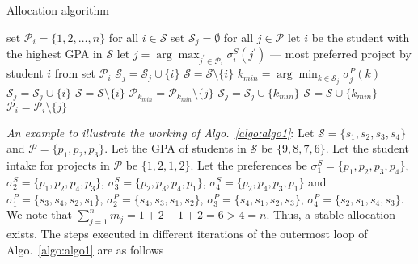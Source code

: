 \documentclass{article}
\begin{document}
\begin{algorithm}[ht]
\caption{Allocation algorithm \label{algo:algo1}}
\begin{algorithmic}[1]
\STATE set $\mathcal{P}_i = \{1,2,\ldots, n\}$ for all $i \in \mathcal{S}$
\STATE set $\mathcal{S}_j = \emptyset$ for all $j \in \mathcal{P}$
\STATE let $i$ be the student with the highest GPA in $\mathcal{S}$
\STATE let $j = \arg \max_{j^{'} \in \mathcal{P}_i } \sigma^S_i(j^{'})$ --- most preferred project by student $i$ from set $\mathcal{P}_i$
\STATE $\mathcal{S}_j = \mathcal{S}_j \cup \{i\}$
\STATE $\mathcal{S} = \mathcal{S} \setminus \{i\}$
\ELSE
\STATE $k_{min} = \arg \min_{k \in \mathcal{S}_j} \sigma^P_j(k)$ 
\STATE $\mathcal{S}_j = \mathcal{S}_j \cup \{ i\}$
\STATE $\mathcal{S} = \mathcal{S} \setminus \{i\}$
\STATE $\mathcal{P}_{k_{min}} = \mathcal{P}_{k_{min}} \setminus \{j\}$ 
\STATE $\mathcal{S}_j = \mathcal{S}_j \cup \{ k_{min}\}$
\STATE $\mathcal{S} = \mathcal{S} \cup \{k_{min}\}$
\ELSE
\STATE $\mathcal{P}_{i} = \mathcal{P}_{i} \setminus \{j\}$ 
\ENDIF
\ENDIF
\ENDWHILE
\end{algorithmic}
\end{algorithm}


\medskip
\noindent
\textit{An example to illustrate the working of Algo.~\ref{algo:algo1}}: Let $\mathcal{S} = \{s_1, s_2, s_3, s_4\}$ and $\mathcal{P} = \{p_1, p_2, p_3\}$. Let the GPA of students in $\mathcal{S}$ be $\{9,8,7,6\}$. Let the student intake for projects in $\mathcal{P}$ be $\{1,2,1,2\}$. Let the preferences be $\sigma^S_1 = \{p_1, p_2, p_3, p_4\}$, $\sigma^S_2 = \{p_1, p_2, p_4, p_3\}$, $\sigma^S_3 = \{p_2, p_3, p_4, p_1\}$, $\sigma^S_4 = \{p_2, p_4, p_3, p_1\}$ and $\sigma^P_1 = \{s_3, s_4, s_2, s_1\}$, $\sigma^P_2 = \{s_4, s_3, s_1, s_2\}$, $\sigma^P_3 = \{s_4, s_1, s_2, s_3\}$, $\sigma^P_4 = \{s_2, s_1, s_4, s_3\}$. We note that $\sum^n_{j=1} m_j = 1+2+1+2 = 6 > 4 = n$. Thus, a stable allocation exists. The steps executed in different iterations of the outermost loop of Algo.~\ref{algo:algo1} are as follows
\end{document}
